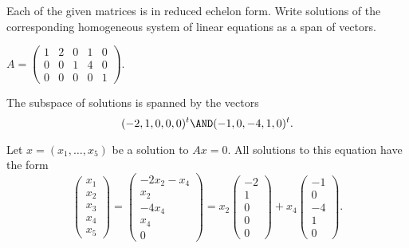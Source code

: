 \documentclass{article}
\begin{document}

\newpage

\problemlabel

\noindent Each of the given matrices is in reduced echelon form.  Write solutions of the corresponding homogeneous system of linear equations as a span of vectors.

\begin{exercise} \label{c5.2.2a}
$A = \left(\begin{array}{rrrrr} 1 & 2 & 0 & 1 & 0 \\
	0 & 0 & 1 & 4 & 0 \\ 0 & 0 & 0 & 0 & 1 \end{array}\right)$.

\begin{solution}

\ans The subspace of solutions is spanned by the vectors
\[
(-2,1,0,0,0)^t \AND (-1,0,-4,1,0)^t.
\]

\soln Let $x = (x_1,\dots ,x_5)$ be a solution to $Ax = 0$.  All
solutions to this equation have the form
\[
\left(\begin{array}{r} x_1 \\ x_2 \\ x_3 \\ x_4 \\ x_5
\end{array}\right) = \left(\begin{array}{c} -2x_2 - x_4 \\ x_2 \\
-4x_4 \\ x_4 \\ 0 \end{array}\right) = x_2\left(\begin{array}{r}
-2 \\ 1 \\ 0 \\ 0 \\ 0 \end{array}\right) +
x_4\left(\begin{array}{r} -1 \\ 0 \\ -4 \\ 1 \\ 0
\end{array}\right).
\]

\end{solution}
\end{exercise}
\end{document}
